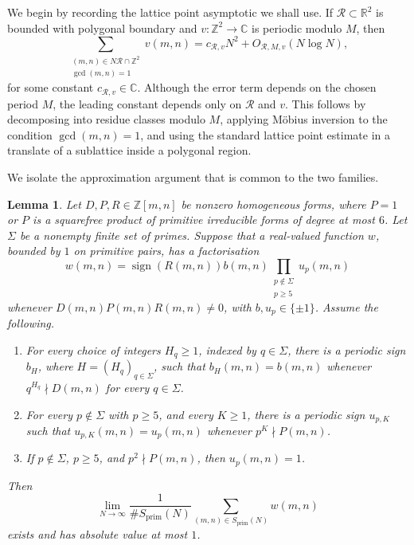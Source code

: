 \documentclass[12pt,reqno]{amsart}
\numberwithin{equation}{section}
\newtheorem{lemma}[theorem]{Lemma}
\theoremstyle{definition}
\renewcommand{\ge}{\geqslant}
\newcommand{\ZZ}{\mathbb{Z}}
\newcommand{\RR}{\mathbb{R}}
\newcommand{\CC}{\mathbb{C}}
\DeclareMathOperator{\sign}{sign}
\begin{document}
We begin by recording the lattice point asymptotic we shall use.
If $\mathcal R\subset \RR^2$ is bounded with polygonal boundary and $v:\ZZ^2\to \CC$ is periodic modulo $M$, then
\begin{equation}\label{eq:asy-periodic}
\sum_{\substack{(m,n)\in N\mathcal R\cap \ZZ^2\\ \gcd(m,n)=1}}v(m,n)
=c_{\mathcal R,v}N^2+O_{\mathcal R,M,v}(N\log N),
\end{equation}
for some constant $c_{\mathcal R,v}\in \CC$.
Although the error term depends on the chosen period $M$, the leading constant depends only on $\mathcal R$ and $v$.
This follows by decomposing into residue classes modulo $M$, applying M\"obius inversion to the condition $\gcd(m,n)=1$, and using the standard lattice point estimate in a translate of a sublattice inside a polygonal region.

We isolate the approximation argument that is common to the two families.

\begin{lemma}\label{lem:periodic-approximation}
Let $D,P,R\in\ZZ[m,n]$ be nonzero homogeneous forms, where $P=1$ or $P$ is a squarefree product of primitive irreducible forms of degree at most $6$.
Let $\Sigma$ be a nonempty finite set of primes.
Suppose that a real-valued function $w$, bounded by $1$ on primitive pairs, has a factorisation
\begin{equation}\label{eq:periodic-template}
w(m,n)=\sign(R(m,n))b(m,n)
\prod_{\substack{p\notin\Sigma\\p\ge5}}u_p(m,n)
\end{equation}
whenever $D(m,n)P(m,n)R(m,n)\ne0$, with $b,u_p\in\{\pm1\}$.
Assume the following.
\begin{enumerate}
\item For every choice of integers $H_q\ge1$, indexed by $q\in\Sigma$, there is a periodic sign $b_H$, where $H=(H_q)_{q\in\Sigma}$, such that $b_H(m,n)=b(m,n)$ whenever $q^{H_q}\nmid D(m,n)$ for every $q\in\Sigma$.
\item For every $p\notin\Sigma$ with $p\ge5$, and every $K\ge1$, there is a periodic sign $u_{p,K}$ such that $u_{p,K}(m,n)=u_p(m,n)$ whenever $p^K\nmid P(m,n)$.
\item If $p\notin\Sigma$, $p\ge5$, and $p^2\nmid P(m,n)$, then $u_p(m,n)=1$.
\end{enumerate}
Then
\[
\lim_{N\to\infty}
\frac{1}{\#S_{\mathrm{prim}}(N)}
\sum_{(m,n)\in S_{\mathrm{prim}}(N)}w(m,n)
\]
exists and has absolute value at most $1$.
\end{lemma}
\end{document}
